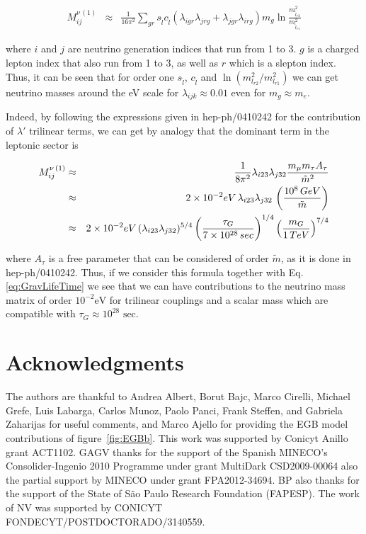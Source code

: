 \documentclass[a4paper,11pt]{article}
\begin{document}
\begin{eqnarray*}
M_{ij}^{\nu\,(1)} & \approx & \frac{1}{16\pi^{2}}\sum_{gr}s_{\tilde{l}}c_{\tilde{l}}(\lambda_{igr}\lambda_{jrg}+\lambda_{jgr}\lambda_{irg})m_{g}\ln\frac{m_{\tilde{l}_{r2}}^{2}}{m_{\tilde{l}_{r1}}^{2}}
\end{eqnarray*}


\noindent where $i$ and $j$ are neutrino generation indices that
run from 1 to 3. $g$ is a charged lepton index that also run from
1 to 3, as well as $r$ which is a slepton index. Thus, it can be
seen that for order one $s_{\tilde{l}}$, $c_{\tilde{l}}$ and $\ln(m_{l_{r2}}^{2}/m_{l_{r1}}^{2})$
we can get neutrino masses around the eV scale for $\lambda_{ijk}\approx0.01$
even for $m_{g}\approx m_{e}$. 

Indeed, by following the expressions given in hep-ph/0410242 for the
contribution of $\lambda'$ trilinear terms, we can get by analogy
that the dominant term in the leptonic sector is 

\begin{eqnarray*}
M_{ij}^{\nu\,(1)} & \approx & \frac{1}{8\pi^{2}}\lambda_{i23}\lambda_{j32}\frac{m_{\mu}m_{\tau}A_{\tau}}{\tilde{m}^{2}}\\
 & \approx & 2\times10^{-2}\mbox{eV}\,\lambda_{i23}\lambda_{j32}\,\left(\frac{10^{8}\mbox{\,GeV}}{\tilde{m}}\right)\\
 & \approx & 2\times10^{-2}\mbox{eV}\,(\lambda_{i23}\lambda_{j32})^{5/4}\left(\frac{\tau_{G}}{7\times10^{\text{28}}\,\mbox{sec}}\right)^{1/4}\left(\frac{m_{G}}{1\,\mbox{TeV}}\right)^{7/4}
\end{eqnarray*}


\noindent where $A_{\tau}$ is a free parameter that can be considered
of order $\tilde{m}$, as it is done in hep-ph/0410242. Thus, if we
consider this formula together with Eq. \ref{eq:GravLifeTime} we
see that we can have contributions to the neutrino mass matrix of
order $10^{-2}\mbox{eV}$ for trilinear couplings and a scalar mass
which are compatible with $\tau_{G}\approx10^{28}\mbox{ sec}$.


\section*{Acknowledgments}

{\small 
The authors are thankful to Andrea Albert, Borut Bajc, Marco Cirelli, Michael Grefe, Luis Labarga, Carlos Munoz, Paolo Panci, Frank Steffen, and Gabriela Zaharijas for useful comments, and Marco Ajello for providing the EGB model contributions of figure~\ref{fig:EGBb}.
 This work was supported by Conicyt Anillo grant ACT1102. GAGV thanks for the support of the Spanish MINECO's Consolider-Ingenio 2010 Programme under grant MultiDark CSD2009-00064 also the partial support by MINECO under grant FPA2012-34694. BP also thanks for the support of the State of S\~{a}o Paulo Research Foundation (FAPESP). The work of NV was supported by CONICYT FONDECYT/POSTDOCTORADO/3140559.
}



\end{document}

